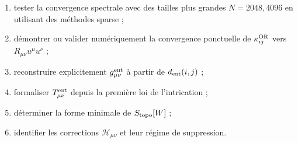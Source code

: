 \documentclass[11pt,a4paper]{article}
\begin{document}
\begin{enumerate}
    \item tester la convergence spectrale avec des tailles plus grandes
    \(N=2048,4096\) en utilisant des méthodes sparse ;
    \item démontrer ou valider numériquement la convergence ponctuelle de
    \(\kappa_{ij}^{\rm OR}\) vers \(R_{\mu\nu}u^\mu u^\nu\) ;
    \item reconstruire explicitement \(g_{\mu\nu}^{\rm ent}\) à partir de
    \(d_{\rm ent}(i,j)\) ;
    \item formaliser \(T_{\mu\nu}^{\rm ent}\) depuis la première loi de
    l'intrication ;
    \item déterminer la forme minimale de \(S_{\rm topo}[W]\) ;
    \item identifier les corrections \(\mathcal{H}_{\mu\nu}\) et leur régime
    de suppression.
\end{enumerate}
\end{document}
